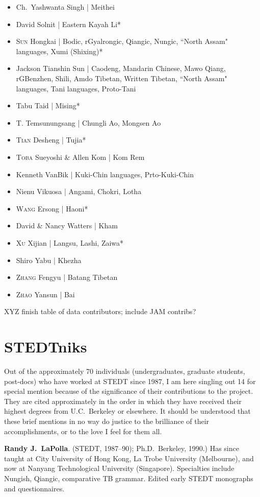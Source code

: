 \begin{itemize}
\item Ch.\ Yashwanta Singh | Meithei
\item David Solnit | Eastern Kayah Li*
\item \textsc{Sun} Hongkai | Bodic, rGyalrongic, Qiangic, Nungic, ``North Assam" languages, Xumi (Shixing)*
\item Jackson Tianshin Sun | Caodeng, Mandarin Chinese, Mawo Qiang, rGBenzhen, Shili, Amdo Tibetan, Written Tibetan, ``North Assam" languages, Tani languages, Proto-Tani
\item Tabu Taid | Mising*
\item T. Temsunungsang | Chungli Ao, Mongsen Ao
\item \textsc{Tian} Desheng | Tujia*
\item \textsc{Toba} Sueyoshi \& Allen Kom | Kom Rem
\item Kenneth VanBik | Kuki-Chin languages, Prto-Kuki-Chin
\item Nienu Vikuosa | Angami, Chokri, Lotha
\item \textsc{Wang} Ersong | Haoni*
\item David \& Nancy Watters | Kham
\item \textsc{Xu} Xijian | Langsu, Lashi, Zaiwa*
\item Shiro Yabu | Khezha
\item \textsc{Zhang} Fengyu | Batang Tibetan
\item \textsc{Zhao} Yansun | Bai
\end{itemize}

XYZ finish table of data contributors; include JAM contribs?

\section{STEDTniks}

Out of the approximately 70 individuals (undergraduates, graduate students, post-docs) who have worked at STEDT since 1987, I am here singling out 14 for special mention because of the significance of their contributions to the project. They are cited approximately in the order in which they have received their highest degrees from U.C.\ Berkeley or elsewhere. It should be understood that these brief mentions in no way do justice to the brilliance of their accomplishments, or to the love I feel for them all.

\textbf{Randy J.\ LaPolla}. (STEDT, 1987–90); Ph.D.\ Berkeley, 1990.) Has since taught at City University of Hong Kong, La Trobe University (Melbourne), and now at Nanyang Technological University (Singapore). Specialties include Nungish, Qiangic, comparative TB grammar. Edited early STEDT monographs and questionnaires.


